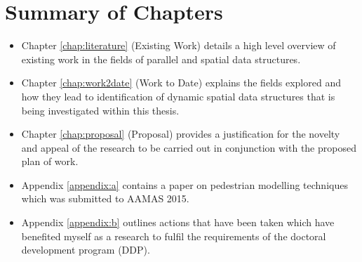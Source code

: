 \begin{comment}
  \section{Publications}
    \begin{itemize}
      \item 
    \end{itemize}
\end{comment}

  \section{Summary of Chapters}
    \begin{itemize}
      \item Chapter \ref{chap:literature} (Existing Work) details a high level overview of existing work in the fields of parallel and spatial data structures.
    
      \item Chapter \ref{chap:work2date} (Work to Date) explains the fields explored and how they lead to identification of dynamic spatial data structures that is being investigated within this thesis.
      
      \item Chapter \ref{chap:proposal} (Proposal) provides a justification for the novelty and appeal of the research to be carried out in conjunction with the proposed plan of work.
      
      \item Appendix \ref{appendix:a} contains a paper on pedestrian modelling techniques which was submitted to AAMAS 2015.
      
      \item Appendix \ref{appendix:b} outlines actions that have been taken which have benefited myself as a research to fulfil the requirements of the doctoral development program (DDP).
    \end{itemize}
